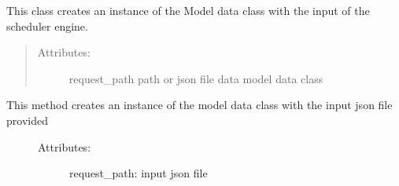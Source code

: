 \documentclass[letterpaper,10pt,english]{sphinxmanual}
\begin{document}
\begin{fulllineitems}
\label{\detokenize{index:src.model_data_factory.ModelDataFactory}}
\sphinxAtStartPar
{}

\sphinxAtStartPar
This class creates an instance of the Model data class with the input of the scheduler engine.
\begin{quote}
\begin{description}
\item[{Attributes:}] \leavevmode
\sphinxAtStartPar
request\_path                 path or json file
data                         model data class

\end{description}
\end{quote}

\begin{fulllineitems}
\label{\detokenize{index:src.model_data_factory.ModelDataFactory.create}}
\sphinxAtStartPar
{}
\begin{description}
\item[{This method creates an instance of the model data class with the input json file provided}] \leavevmode\begin{description}
\item[{Attributes:}] \leavevmode
\sphinxAtStartPar
request\_path:                 input json file

\end{description}

\end{description}

\end{fulllineitems}


\end{fulllineitems}
\end{document}
